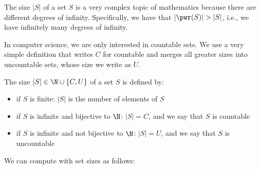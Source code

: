 The size $|S|$ of a set $S$ is a very complex topic of mathematics because there are different degrees of infinity.
Specifically, we have that $|\pwr(S)|>|S|$, i.e., we have infinitely many degrees of infinity.

In computer science, we are only interested in countable sets.
We use a very simple definition that writes $C$ for countable and merges all greater sizes into uncountable sets, whose size we write as $U$.

\begin{definition}\label{def:setsize}
The size $|S|\in\N\cup\{C,U\}$ of a set $S$ is defined by:
\begin{itemize}
\item if $S$ is finite: $|S|$ is the number of elements of $S$
\item if $S$ is infinite and bijective to $\N$: $|S|=C$, and we say that $S$ is countable
\item if $S$ is infinite and not bijective to $\N$: $|S|=U$, and we say that $S$ is uncountable
\end{itemize}
\end{definition}

We can compute with set sizes as follows:


